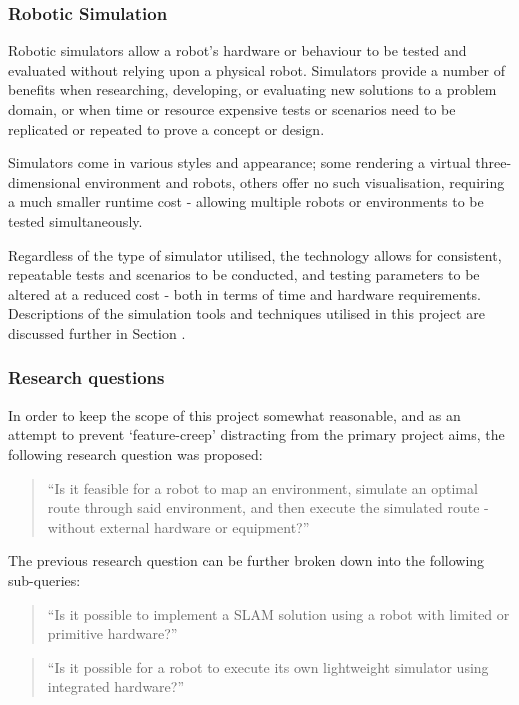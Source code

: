 \subsubsection{Robotic Simulation}
Robotic simulators allow a robot's hardware or behaviour to be tested and
evaluated without relying upon a physical robot.
Simulators provide a number of benefits when researching, developing, or
evaluating new solutions to a problem domain, or when time or resource
expensive tests or scenarios need to be replicated or repeated to prove a
concept or design.

Simulators come in various styles and appearance; some rendering a virtual
three-dimensional  environment and robots, others offer no such visualisation,
requiring a much smaller runtime cost - allowing multiple robots or
environments to be tested simultaneously.

Regardless of the type of simulator utilised, the technology allows for
consistent, repeatable tests and scenarios to be conducted, and testing
parameters to be altered at a reduced cost - both in terms of time and
hardware requirements.
Descriptions of the simulation tools and techniques utilised in this project
are discussed further in Section .


\subsubsection{Research questions} \label{sec_res_q}
In order to keep the scope of this project somewhat reasonable, and as an
attempt to prevent `feature-creep' distracting from the primary project aims,
the following research question was proposed:
\begin{quote}
    ``Is it feasible for a robot to map an environment, simulate an optimal
    route through said environment, and then execute the simulated route -
    without external hardware or equipment?''
\end{quote}

The previous research question can be further broken down into the following
sub-queries:

\begin{quote}
    ``Is it possible to implement a SLAM solution using a robot with limited or
    primitive hardware?''
\end{quote}

\begin{quote}
    ``Is it possible for a robot to execute its own lightweight simulator using
    integrated hardware?''
\end{quote}

